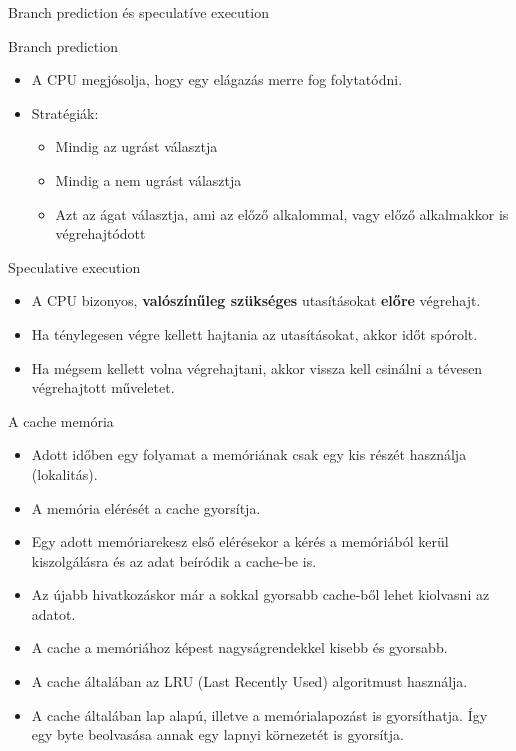 \documentclass[12 pt]{beamer}
\begin{document}
\begin{frame}{Branch prediction és speculatíve execution}
  \begin{block}{Branch prediction}
    \begin{itemize}
      \item{A CPU megjósolja, hogy egy elágazás merre fog folytatódni.}
      \item{Stratégiák:}
        \begin{itemize}
          \item{Mindig az ugrást választja}
          \item{Mindig a nem ugrást választja}
          \item{Azt az ágat választja, ami az előző alkalommal, vagy előző alkalmakkor is végrehajtódott}
        \end{itemize}
    \end{itemize}
  \end{block}
  \begin{block}{Speculative execution}
    \begin{itemize}
      \item{A CPU bizonyos, \textbf{valószínűleg szükséges} utasításokat \textbf{előre} végrehajt.}
      \item{Ha ténylegesen végre kellett hajtania az utasításokat, akkor időt spórolt.}
      \item{Ha mégsem kellett volna végrehajtani, akkor vissza kell csinálni a tévesen végrehajtott műveletet.}
    \end{itemize}
  \end{block}
\end{frame}

\begin{frame}{A cache memória}
  \begin{itemize}
    \item{Adott időben egy folyamat a memóriának csak egy kis részét használja (lokalitás).}
    \item{A memória elérését a cache gyorsítja.}
    \item{Egy adott memóriarekesz első elérésekor a kérés a memóriából kerül kiszolgálásra és az adat beíródik a cache-be is.}
    \item{Az újabb hivatkozáskor már a sokkal gyorsabb cache-ből lehet kiolvasni az adatot.}
    \item{A cache a memóriához képest nagyságrendekkel kisebb és gyorsabb.}
    \item{A cache általában az LRU (Last Recently Used) algoritmust használja.}
    \item{A cache általában lap alapú, illetve a memórialapozást is gyorsíthatja. Így egy byte beolvasása annak egy lapnyi körnezetét is gyorsítja.}
  \end{itemize}
\end{frame}
\end{document}
